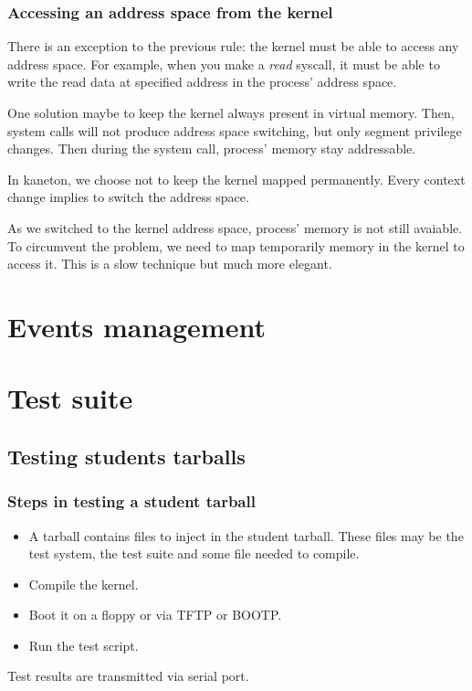 
\begin{frame}
  \frametitle{Accessing an address space from the kernel}

  There is an exception to the  previous rule: the kernel must be able
  to  access  any  address  space.   For  example,  when  you  make  a
  \emph{read}  syscall, it  must be  able to  write the  read  data at
  specified address in the process' address space.

  \-

  One  solution maybe  to keep  the kernel  always present  in virtual
  memory. Then, system calls will not produce address space switching,
  but  only segment privilege  changes. Then  during the  system call,
  process' memory stay addressable.

  \-

  In   kaneton,   we   choose   not   to  keep   the   kernel   mapped
  permanently.  Every context  change  implies to  switch the  address
  space.

  \-

  As we switched  to the kernel address space,  process' memory is not
  still  avaiable.   To  circumvent  the  problem,  we   need  to  map
  temporarily  memory in  the  kernel to  access  it. This  is a  slow
  technique but much more elegant.
\end{frame}

%
%

\section{Events management}

%
%

\section{Test suite}

%
%

\subsection{Testing students tarballs}


\begin{frame}
  \frametitle{Steps in testing a student tarball}

  \begin{itemize}
  \item A tarball contains files to inject in the student tarball. These files may be the test system, the test suite and some file needed to compile.
  \item Compile the kernel.
  \item Boot it on a floppy or via TFTP or BOOTP.
  \item Run the test script.
  \end{itemize}

  \-

  Test results are transmitted via serial port.

\end{frame}

